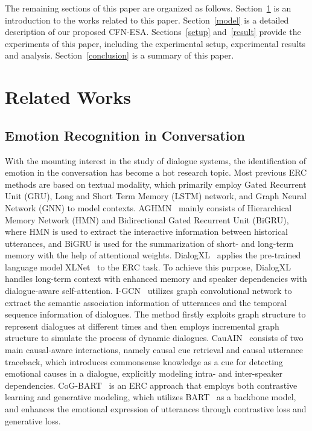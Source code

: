 \documentclass[journal]{IEEEtran}
\begin{document}
The remaining sections of this paper are organized as follows. Section~\ref{work} is an introduction to the works related to this paper. Section~\ref{model} is a detailed description of our proposed CFN-ESA. Sections~\ref{setup} and~\ref{result} provide the experiments of this paper, including the experimental setup, experimental results and analysis. Section~\ref{conclusion} is a summary of this paper.

\section{Related Works}\label{work}
\subsection{Emotion Recognition in Conversation}
With the mounting interest in the study of dialogue systems, the identification of emotion in the conversation has become a hot research topic. Most previous ERC methods are based on textual modality, which primarily employ Gated Recurrent Unit (GRU), Long and Short Term Memory (LSTM) network, and Graph Neural Network (GNN) to model contexts. 
AGHMN~\cite{jiao2020real} mainly consists of Hierarchical Memory Network (HMN) and Bidirectional Gated Recurrent Unit (BiGRU), where HMN is used to extract the interactive information between historical utterances, and BiGRU is used for the summarization of short- and long-term memory with the help of attentional weights. 
DialogXL~\cite{shen2021dialogxl} applies the pre-trained language model XLNet~\cite{yang2019xlnet} to the ERC task. To achieve this purpose, DialogXL handles long-term context with enhanced memory and speaker dependencies with dialogue-aware self-attention. 
I-GCN~\cite{nie2022igcn} utilizes graph convolutional network to extract the semantic association information of utterances and the temporal sequence information of dialogues. The method firstly exploits graph structure to represent dialogues at different times and then employs incremental graph structure to simulate the process of dynamic dialogues.
CauAIN~\cite{zhao2022cauain} consists of two main causal-aware interactions, namely causal cue retrieval and causal utterance traceback, which introduces commonsense knowledge as a cue for detecting emotional causes in a dialogue, explicitly modeling intra- and inter-speaker dependencies.
CoG-BART~\cite{li2022contrast} is an ERC approach that employs both contrastive learning and generative modeling, which utilizes BART~\cite{lewis2020bart} as a backbone model, and enhances the emotional expression of utterances through contrastive loss and generative loss.
\end{document}
